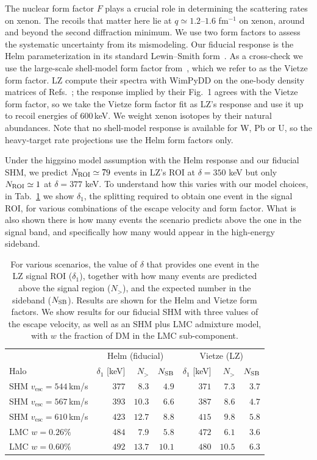 \documentclass[reprint,superscriptaddress,preprintnumbers,amsmath,amssymb,aps,prd,tightenlines,longbibliography,nofootinbib]{revtex4-2}
\begin{document}
The nuclear form factor $F$ plays a crucial role in determining the scattering rates on xenon. The recoils that matter here lie at $q \simeq 1.2$--$1.6$ fm$^{-1}$ on xenon, around and beyond the second diffraction minimum.  We use two form factors to assess the systematic uncertainty from its mismodeling. Our fiducial response is the Helm parameterization in its standard Lewin--Smith form~\cite{Lewin:1995rx}. 
As a cross-check we use the large-scale shell-model form factor from~\cite{Vietze:2014vsa}, which we refer to as the Vietze form factor.
LZ compute their spectra with WimPyDD on the one-body density matrices of Refs.~\cite{Anand:2013yka,LZ:2026axp}; the response implied by their Fig.~1 agrees with the Vietze form factor, so we take the Vietze form factor fit as LZ's response and use it up to recoil energies of $600$\,keV.
We weight xenon isotopes by their natural abundances.
Note that no shell-model response is available for W, Pb or U, so the heavy-target rate projections use the Helm form factors only.

Under the higgsino model assumption with the Helm response and our fiducial SHM, we predict $N_{\rm ROI} \simeq 79$ events in LZ's ROI at $\delta = 350$ keV but only $N_{\rm ROI} \simeq 1$ at $\delta = 377$ keV.
To understand how this varies with our model choices, in Tab.~\ref{tab:ff} we show $\delta_1$, the splitting required to obtain one event in the signal ROI, for various combinations of the escape velocity and form factor.
What is also shown there is how many events the scenario predicts above the one in the signal band, and specifically how many would appear in the high-energy sideband.

\begin{table}[t]
\centering
\footnotesize
\setlength{\tabcolsep}{3pt}
\begin{tabular}{lrrrrrr}
\toprule
 & \multicolumn{3}{c}{Helm (fiducial)} & \multicolumn{3}{c}{Vietze (LZ)} \\
Halo & $\delta_1$ [keV] & $N_{>}$ & $N_{\rm SB}$ & $\delta_1$ [keV] & $N_{>}$ & $N_{\rm SB}$ \\
\midrule
SHM $v_\textrm{esc} =544\,$km/s & $377$ & $8.3$ & $4.9$ & $371$ & $7.3$ & $3.7$ \\
SHM $v_\textrm{esc} = 567\,$km/s & $393$ & $10.3$ & $6.6$ & $387$ & $8.6$ & $4.7$ \\
SHM $v_\textrm{esc} = 610\,$km/s & $423$ & $12.7$ & $8.8$ & $415$ & $9.8$ & $5.8$ \\
LMC $w=0.26\%$ & $484$ & $7.9$ & $5.8$ & $472$ & $6.1$ & $3.6$ \\
LMC $w=0.60\%$ & $492$ & $13.7$ & $10.1$ & $480$ & $10.5$ & $6.3$ \\
\bottomrule
\end{tabular}
\caption{For various scenarios, the value of $\delta$ that provides one event in the LZ signal ROI ($\delta_1$), together with how many events are predicted above the signal region ($N_{>}$), and the expected number in the sideband ($N_{\rm SB}$).
Results are shown for the Helm and Vietze form factors.
We show results for our fiducial SHM with three values of the escape velocity, as well as an SHM plus LMC admixture model, with $w$ the fraction of DM in the LMC sub-component.
}
\label{tab:ff}
\end{table}
\end{document}
